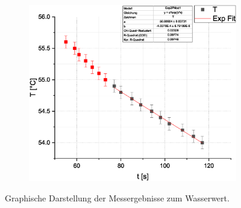 \documentclass[10pt,a4paper]{article}
\begin{document}
\begin{figure}[H]
\begin{subfigure}[c]{.5\textwidth}
\centering
\includegraphics[scale=0.3]{Reihe5}
\label{fig:r5}
\end{subfigure}%
\caption{Graphische Darstellung der Messergebnisse zum Wasserwert.}
\label{fig:reihen}
\end{figure}
\end{document}
